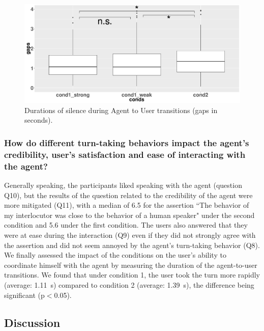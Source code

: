 \documentclass[twocolumn]{svjour3}
\begin{document}
\begin{figure}
\centering
\includegraphics[width=\linewidth]{figure/boxTransitionsAU.pdf}
\caption{Durations of silence during Agent to User transitions (gaps in seconds).}
\label{box_au}
\end{figure}

\subsubsection{How do different turn-taking behaviors impact the agent's credibility, user's satisfaction and ease of interacting with the agent?}

Generally speaking, the participants liked speaking with the agent (question Q10), but the results of the question related to the credibility of the agent were more mitigated (Q11), with a median of 6.5 for the assertion ``The behavior of my interlocutor was close to the behavior of a human speaker" under the second condition and 5.6 under the first condition. The users also answered that they were at ease during the interaction (Q9) even if they did not strongly agree with the assertion and did not seem annoyed by the agent's turn-taking behavior (Q8). 
We finally assessed the impact of the conditions on the user's ability to coordinate himself with the agent by measuring the duration of the agent-to-user transitions. We found that under condition 1, the user took the turn more rapidly (average: 1.11~s) compared to condition 2 (average: 1.39~s), the difference being significant (p$<$0.05). 


\subsection{Discussion}
\end{document}

